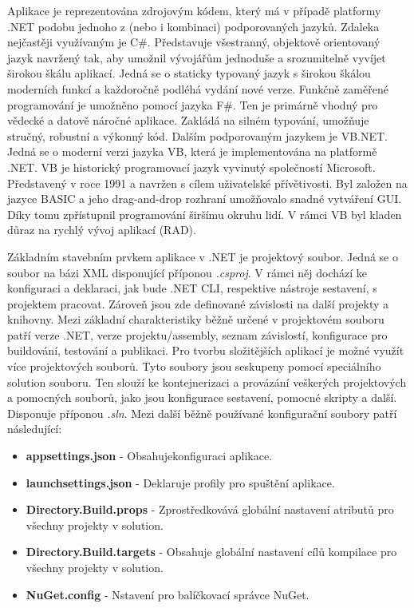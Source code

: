 Aplikace je reprezentována zdrojovým kódem, který má v případě platformy .NET podobu jednoho z (nebo i kombinaci) podporovaných jazyků. Zdaleka nejčastěji využívaným je C\#. Představuje všestranný, objektově orientovaný jazyk navržený tak, aby umožnil vývojářům jednoduše a srozumitelně vyvíjet širokou škálu aplikací. \cite{Price2023c8} Jedná se o staticky typovaný jazyk s širokou škálou moderních funkcí a každoročně podléhá vydání nové verze. Funkčně zaměřené programování je umožněno pomocí jazyka F\#. Ten je primárně vhodný pro vědecké a datově náročné aplikace. \cite{Price2023c8} Zakládá na silném typování, umožňuje stručný, robustní a výkonný kód. Dalším podporovaným jazykem je VB.NET. Jedná se o moderní verzi jazyka VB, která je implementována na platformě .NET. VB je historický programovací jazyk vyvinutý společností Microsoft. Představený v roce 1991 a navržen s cílem uživatelské přívětivosti. Byl založen na jazyce BASIC a jeho drag-and-drop rozhraní umožňovalo snadné vytváření GUI. Díky tomu zpřístupnil programování širšímu okruhu lidí. V rámci VB byl kladen důraz na rychlý vývoj aplikací (RAD).


Základním stavebním prvkem aplikace v .NET je projektový soubor. Jedná se o soubor na bázi XML disponující příponou \emph{.csproj}. V rámci něj dochází ke konfiguraci a deklaraci, jak bude .NET CLI, respektive nástroje sestavení, s projektem pracovat. Zároveň jsou zde definované závislosti na další projekty a knihovny. \cite{Alls2023} Mezi základní charakteristiky běžně určené v projektovém souboru patří verze .NET, verze projektu/assembly, seznam závislostí, konfigurace pro buildování, testování a publikaci. Pro tvorbu složitějších aplikací je možné využít více projektových souborů. Tyto soubory jsou seskupeny pomocí speciálního solution souboru. Ten slouží ke kontejnerizaci a provázání veškerých projektových a pomocných souborů, jako jsou konfigurace sestavení, pomocné skripty a další. Disponuje příponou \emph{.sln}. Mezi další běžně používané konfigurační soubory patří následující:

\begin{itemize}
    \item \textbf{appsettings.json} - Obsahujekonfiguraci aplikace.
    \item \textbf{launchsettings.json} - Deklaruje profily pro spuštění aplikace.
    \item \textbf{Directory.Build.props} - Zprostředkovává globální nastavení atributů pro všechny projekty v solution.
    \item \textbf{Directory.Build.targets} - Obsahuje globální nastavení cílů kompilace pro všechny projekty v solution.
    \item \textbf{NuGet.config} - Nstavení pro balíčkovací správce NuGet.
\end{itemize}

